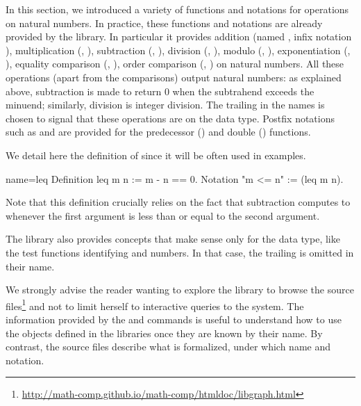 

In this section, we introduced a variety of functions and notations
for operations on natural numbers.  In practice, these functions and
notations are already provided by the \mcbMC{} library.  In particular
it provides addition (named , infix notation \C{+}),
multiplication
(, \C{*}), subtraction (, \C{-}), division (,
\C{\%/}),  modulo (, \C{\%\%}), exponentiation (, \C{\^}),
equality comparison (, \C{==}), order
comparison (, \C{<=}) on natural numbers.  All these operations
(apart from the comparisons)
output natural numbers: as explained above, subtraction is made to
return \(0\) when the subtrahend exceeds the minuend; similarly,
division is integer division.  The trailing  in
the names is chosen to signal that these operations are on the  data
type.  Postfix notations such as  and  are provided for
the predecessor () and double () functions.

We detail here the definition of  since it will be often used
in examples.

\begin{coq}{name=leq}{}
Definition leq m n := m - n == 0.
Notation "m <= n" := (leq m n).
\end{coq}

Note that this definition crucially relies on the fact that
subtraction computes to  whenever the first argument is less than
or equal to the second argument.

The \mcbMC{} library also provides concepts that make sense only
for the  data type, like the
test functions identifying  and  numbers. In that
case, the trailing  is omitted in their name.

We strongly advise the reader wanting to explore the \mcbMC{} library
to browse the source
files\footnote{\url{http://math-comp.github.io/math-comp/htmldoc/libgraph.html}}
and not to limit herself to interactive queries to the system. The
information provided by the  and  commands is
useful to understand how to use the objects defined in the libraries
once they are known by their name. By contrast, the source
files describe what is formalized, under which name and notation.

